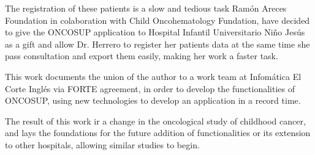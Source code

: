 The registration of these patients is a slow and tedious task Ramón Areces Foundation in colaboration with Child Oncohematology Fundation, have decided to give the ONCOSUP application to Hospital Infantil Universitario Niño Jesús as a gift and allow Dr. Herrero to register her patients data at the same time she pass consultation and export them easily, making her work a faster task.

This work documents the union of the author to a work team at Infomática El Corte Inglés via FORTE agreement, in order to develop the functionalities of ONCOSUP, using new technologies to develop an application in a record time.

The result of this work ir a change in the oncological study of childhood cancer, and lays the foundations for the future addition of functionalities or its extension to other hospitals, allowing similar studies to begin.
